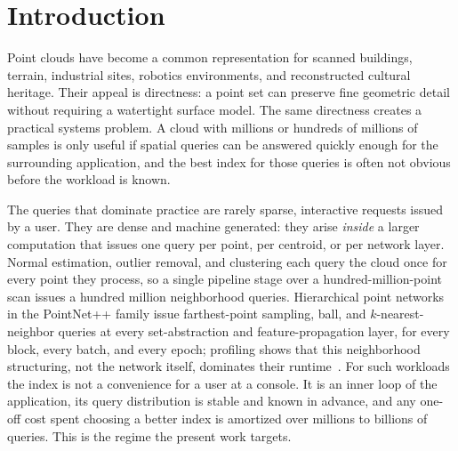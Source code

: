 \section{Introduction}
\label{sec:introduction}

Point clouds have become a common representation for scanned buildings, terrain, industrial sites, robotics environments, and reconstructed cultural heritage. Their appeal is directness: a point set can preserve fine geometric detail without requiring a watertight surface model. The same directness creates a practical systems problem. A cloud with millions or hundreds of millions of samples is only useful if spatial queries can be answered quickly enough for the surrounding application, and the best index for those queries is often not obvious before the workload is known.

The queries that dominate practice are rarely sparse, interactive requests issued by a user. They are dense and machine generated: they arise \emph{inside} a larger computation that issues one query per point, per centroid, or per network layer. Normal estimation, outlier removal, and clustering each query the cloud once for every point they process, so a single pipeline stage over a hundred-million-point scan issues a hundred million neighborhood queries. Hierarchical point networks in the PointNet++ family issue farthest-point sampling, ball, and $k$-nearest-neighbor queries at every set-abstraction and feature-propagation layer, for every block, every batch, and every epoch; profiling shows that this neighborhood structuring, not the network itself, dominates their runtime~\cite{qi2017pointnetpp,li2022psnet}. For such workloads the index is not a convenience for a user at a console. It is an inner loop of the application, its query distribution is stable and known in advance, and any one-off cost spent choosing a better index is amortized over millions to billions of queries. This is the regime the present work targets.

